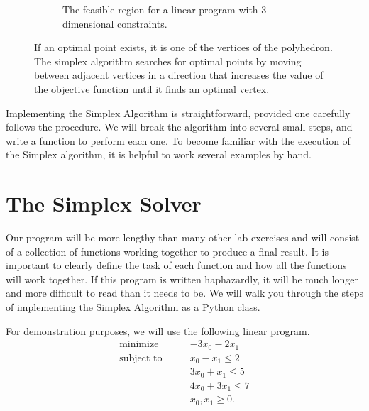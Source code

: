 \begin{figure}[H]
\begin{subfigure}{.5\textwidth}
\begin{center}
    \end{center}
    \caption{The feasible region for a linear program with 3-dimensional constraints.}
\end{subfigure}
\caption{If an optimal point exists, it is one of the vertices of the polyhedron.
The simplex algorithm searches for optimal points by moving between adjacent vertices in a direction that increases the value of the objective function until it finds an optimal vertex.}
\label{fig:polytope}
\end{figure}




Implementing the Simplex Algorithm is straightforward, provided one carefully follows the procedure.
We will break the algorithm into several small steps, and write a function to perform each one.
To become familiar with the execution of the Simplex algorithm, it is helpful to work several examples by hand.

\section*{The Simplex Solver} %

Our program will be more lengthy than many other lab exercises and will consist of a collection of functions working together to produce a final result.
It is important to clearly define the task of each function and how all the functions will work together.
If this program is written haphazardly, it will be much longer and more difficult to read than it needs to be.
We will walk you through the steps of implementing the Simplex Algorithm as a Python class.

For demonstration purposes, we will use the following linear program.
\begin{align*}
\text{minimize}\qquad & -3x_0 - 2x_1 \\
\text{subject to}\qquad
& x_0 - x_1 \leq 2 \\
& 3x_0 + x_1 \leq 5 \\
& 4x_0 + 3x_1 \leq 7 \\
& x_0, x_1 \geq 0.
\end{align*}

